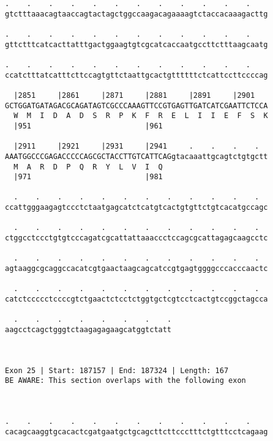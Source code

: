 \documentclass{article}
\begin{document}
\begin{Verbatim}
.    .    .    .    .    .    .    .    .    .    .    .    
gtctttaaacagtaaccagtactagctggccaagacagaaaagtctaccacaaagacttg
                                                            
.    .    .    .    .    .    .    .    .    .    .    .    
gttctttcatcacttatttgactggaagtgtcgcatcaccaatgccttctttaagcaatg
                                                            
.    .    .    .    .    .    .    .    .    .    .    .    
ccatctttatcatttcttccagtgttctaattgcactgttttttctcattccttccccag
                                                            
  |2851     |2861     |2871     |2881     |2891     |2901   
GCTGGATGATAGACGCAGATAGTCGCCCAAAGTTCCGTGAGTTGATCATCGAATTCTCCA
  W  M  I  D  A  D  S  R  P  K  F  R  E  L  I  I  E  F  S  K
  |951                          |961                        
  
  |2911     |2921     |2931     |2941     .    .    .    .  
AAATGGCCCGAGACCCCCAGCGCTACCTTGTCATTCAGgtacaaattgcagtctgtgctt
  M  A  R  D  P  Q  R  Y  L  V  I  Q                        
  |971                          |981                        
  
  .    .    .    .    .    .    .    .    .    .    .    .  
ccattgggaagagtccctctaatgagcatctcatgtcactgtgttctgtcacatgccagc
                                                            
  .    .    .    .    .    .    .    .    .    .    .    .  
ctggcctccctgtgtcccagatcgcattattaaaccctccagcgcattagagcaagcctc
                                                            
  .    .    .    .    .    .    .    .    .    .    .    .  
agtaaggcgcaggccacatcgtgaactaagcagcatccgtgagtggggcccacccaactc
                                                            
  .    .    .    .    .    .    .    .    .    .    .    .  
catctccccctccccgtctgaactctcctctggtgctcgtcctcactgtccggctagcca
                                                            
  .    .    .    .    .    .    .    .
aagcctcagctgggtctaagagagaagcatggtctatt
                                      
                                      
 
Exon 25 | Start: 187157 | End: 187324 | Length: 167
BE AWARE: This section overlaps with the following exon



.    .    .    .    .    .    .    .    .    .    .    .    
cacagcaaggtgcacactcgatgaatgctgcagcttcttccctttctgtttcctcagaag
                                                            

\end{Verbatim}
\end{document}
